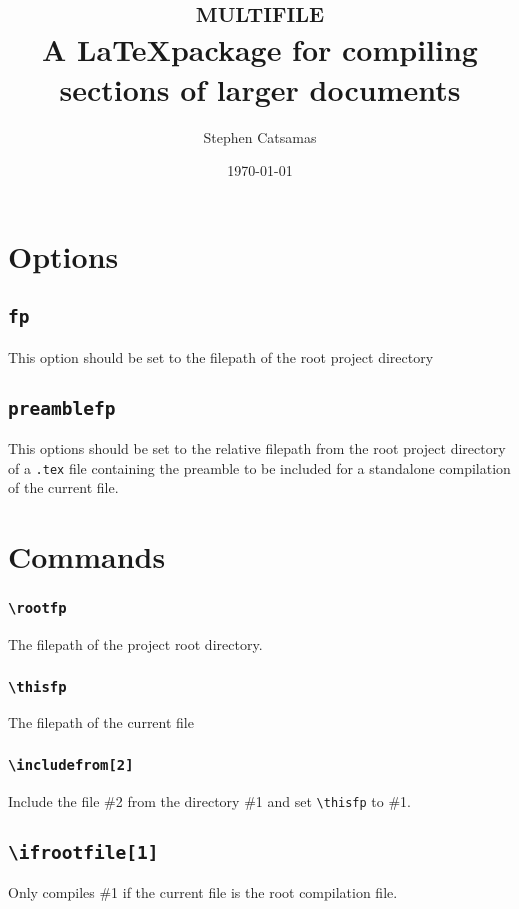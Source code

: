 \documentclass{article}
\title{\Huge\textsc{multifile} \\\vspace*{1 em}
    \large A \LaTeX package for compiling sections of larger documents}
\author{Stephen Catsamas}
\date{\today}
\begin{document}
\maketitle
\tableofcontents


\section{Options}
\subsection{\texttt{fp}}\label{sec:opt:fp}
    This option should be set to the filepath of the root project directory

\subsection{\texttt{preamblefp}}\label{sec:opt:preamblefp}
    This options should be set to the relative filepath from the root project directory of a \texttt{.tex} file containing the preamble to be included for a standalone compilation of the current file. 

\section{Commands}

\subsubsection{\texttt{\textbackslash rootfp}}
    The filepath of the project root directory.

\subsubsection{\texttt{\textbackslash thisfp}}
    The filepath of the current file

\subsubsection{\texttt{\textbackslash includefrom[2]}}
    Include the file \#2 from the directory \#1 and set \texttt{\textbackslash thisfp} to \#1.

\subsection{\texttt{\textbackslash ifrootfile[1]}}
    Only compiles \#1 if the current file is the root compilation file.
\end{document}
